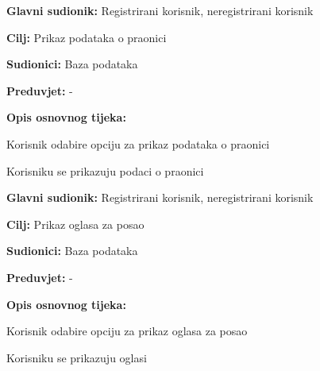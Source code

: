 \noindent {}
\begin{packed_item}
	
	\item \textbf{Glavni sudionik: } Registrirani korisnik, neregistrirani korisnik
	\item  \textbf{Cilj:} Prikaz podataka o praonici
	\item  \textbf{Sudionici:} Baza podataka
	\item  \textbf{Preduvjet:} -
	\item  \textbf{Opis osnovnog tijeka:}
	
	\item[] \begin{packed_enum}
		
		\item Korisnik odabire opciju za prikaz podataka o praonici
		\item Korisniku se prikazuju podaci o praonici
		
	\end{packed_enum}
	
\end{packed_item}

\noindent {}
\begin{packed_item}
	
	\item \textbf{Glavni sudionik:} Registrirani korisnik, neregistrirani korisnik
	\item  \textbf{Cilj:} Prikaz oglasa za posao
	\item  \textbf{Sudionici:} Baza podataka
	\item  \textbf{Preduvjet:} -
	\item  \textbf{Opis osnovnog tijeka:}
	
	\item[] \begin{packed_enum}
		
		\item Korisnik odabire opciju za prikaz oglasa za posao
		\item Korisniku se prikazuju oglasi
		
	\end{packed_enum}
	
\end{packed_item}

